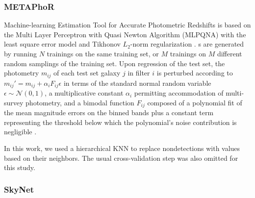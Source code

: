 \subsubsection{METAPhoR}
\label{sec:metaphor}

Machine-learning Estimation Tool for Accurate Photometric Redshifts \citep[\metaphor\footnote{\url{http://dame.dsf.unina.it}},][]{Cavuoti:17} is based on the Multi Layer Perceptron with Quasi Newton Algorithm (MLPQNA) with the least square error model and Tikhonov $L_{2}$-norm regularization \citep{Hofmann:18}.
\Pzpdf s are generated by running $N$ trainings on the same training set, or $M$ trainings on $M$ different random samplings of the training set.
Upon regression of the test set, the photometry $m_{ij}$ of each test set galaxy $j$ in filter $i$ is perturbed according to $m_{ij}' = m_{ij} + \alpha_{i} F_{ij} \epsilon$ in terms of the standard normal random variable $\epsilon \sim \mathcal{N}(0, 1)$, a multiplicative constant $\alpha_{i}$ permitting accommodation of multi-survey photometry, and a bimodal function $F_{ij}$ composed of a polynomial fit of the mean magnitude errors on the binned bands plus a constant term representing the threshold below which the polynomial's noise contribution is negligible \citep{Brescia:18}.

In this work, we used a hierarchical KNN to replace nondetections with values based on their neighbors.
The usual cross-validation step was also omitted for this study.

\subsubsection{SkyNet}
\label{sec:skynet}

